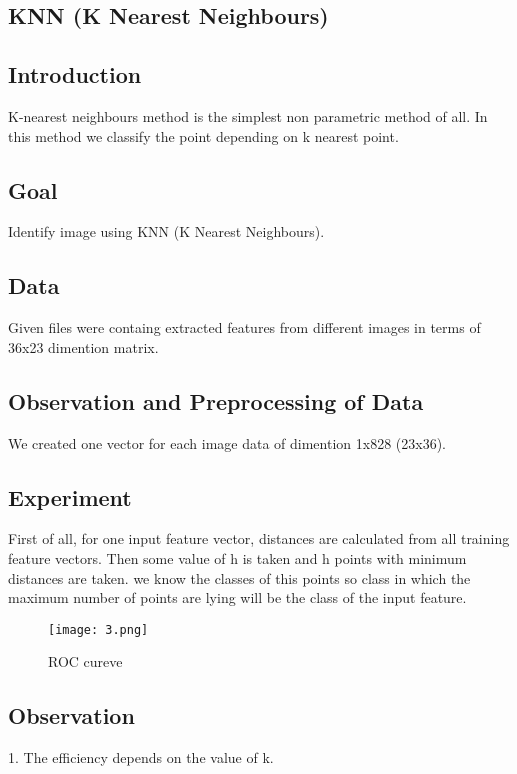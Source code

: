 \begin{center}
\section{KNN (K Nearest Neighbours)}
\end{center}

\subsection{Introduction}
\begin{flushleft}
  K-nearest neighbours method is the simplest non parametric method of all. In this method we classify
  the point depending on k nearest point.
\end{flushleft}

\subsection{Goal}
\begin{flushleft}
    Identify image using KNN (K Nearest Neighbours).
\end{flushleft}

\subsection{Data}
\begin{flushleft}
    Given files were containg extracted features from different images in terms of 36x23 dimention matrix.
\end{flushleft}

\subsection{Observation and Preprocessing of Data}
\begin{flushleft}
  We created one vector for each image data of dimention 1x828 (23x36).
\end{flushleft}

\subsection{Experiment}
\begin{flushleft}
  First of all, for one input feature vector, distances are calculated from all training feature vectors. 
  Then some value of h is taken and h points with minimum distances are taken. we know the classes of this points so class in which the maximum number of points are lying will be the class of the input feature.
  
\begin{figure}[!htb]
\begin{center}
  \texttt{[image: 3.png]}
  \caption{ROC cureve}\label{fig:fig_a}
\endminipage\hfill
\end{center}
\end{figure}
  
\end{flushleft}

\subsection{Observation}
\begin{flushleft}
  1. The efficiency depends on the value of k.
\end{flushleft}